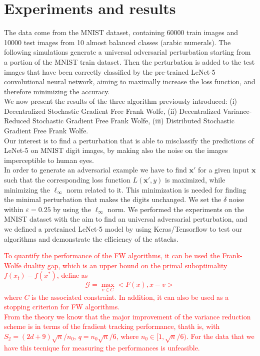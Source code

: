 \section{Experiments and results}
The data come from the MNIST dataset, containing 60000 train images and 10000 test images from 10 almost balanced classes (arabic numerals). The following simulations generate a universal adversarial perturbation starting from a portion of the MNIST train dataset. Then the perturbation is added to the test images that have been correctly classified by the pre-trained LeNet-5 convolutional neural network, aiming to maximally increase the loss function, and therefore minimizing the accuracy.\\
We now present the results of the three algorithm previously introduced: (i) Decentralized Stochastic Gradient Free Frank Wolfe, (ii) Decentralized Variance-Reduced Stochastic Gradient Free Frank Wolfe, (iii) Distributed Stochastic Gradient Free Frank Wolfe.\\
Our interest is to find a perturbation that is able to misclassify the predictions of LeNet-5 on MNIST digit images, by making also the noise on the images imperceptible to human eyes.\\ In order to generate an adversarial example we have to find $\mathbf{x}'$ for a given input $\mathbf{x}$ such that the corresponding loss function $L(\mathbf{x}',y)$ is maximized, while minimizing the $\ell_{\infty}$ norm related to it. This minimization is needed for finding  the minimal perturbation that makes the digits unchanged. We set the $\delta$ noise within $\varepsilon=0.25$ by using the $\ell_{\infty}$ norm. We performed the experiments on the MNIST dataset with the aim to find an universal adversarial perturbation, and we defined a pretrained LeNet-5 model by using Keras/Tensorflow to test our algorithms and demonstrate the efficiency of the attacks.

\textcolor{red}{To quantify the performance of the FW algorithms, it can be used the Frank-Wolfe duality gap, which is an upper bound on the primal suboptimality $f(x_t)-f(x^*)$, define as
	\[ \mathcal{G} = \max_{v \in C} <F(x),x-v> \]
where $C$ is the associated constraint. In addition, it can also be used as a stopping criterion for FW algorithms.\\
From the theory we know that the major improvement of the variance reduction scheme is in terms of the fradient tracking performance, thath is, with $S_2 = (2d+9)\sqrt{n}/n_0$, $q = n_0 \sqrt{n}/6$, where $n_0 \in [1, \sqrt{n}/6)$. For the data that we have this tecnique for measuring the performances is unfeasible.}

